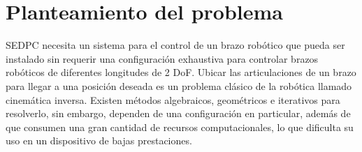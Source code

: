 \section{Planteamiento del problema}

SEDPC necesita un sistema para el control de un brazo robótico que pueda ser instalado sin requerir una configuración exhaustiva para controlar brazos robóticos de diferentes longitudes de 2 DoF.
\newline\newline\newline
Ubicar las articulaciones de un brazo para llegar a una posición deseada es un problema clásico de la robótica llamado cinemática inversa. Existen métodos algebraicos, geométricos e iterativos para resolverlo, sin embargo, dependen de una configuración en particular, además de que consumen una gran cantidad de recursos computacionales, lo que dificulta su uso en un dispositivo de bajas prestaciones.